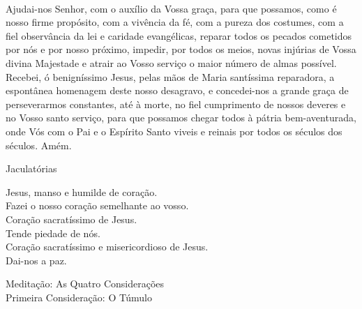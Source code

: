 \documentclass{book}
\begin{document}
\begin{flushleft}
    \vspace{.2cm} \\
    Ajudai-nos Senhor, com o auxílio da Vossa graça, para que possamos, como é nosso firme propósito, com a vivência da fé, com a pureza dos costumes, com a fiel observância da lei e caridade evangélicas, reparar todos os pecados cometidos por nós e por nosso próximo, impedir, por todos os meios, novas injúrias de Vossa divina Majestade e atrair ao Vosso serviço o maior número de almas possível.
    \vspace{.2cm} \\
    Recebei, ó benigníssimo Jesus, pelas mãos de Maria santíssima reparadora, a espontânea homenagem deste nosso desagravo, e concedei-nos a grande graça de perseverarmos constantes, até à morte, no fiel cumprimento de nossos deveres e no Vosso santo serviço, para que possamos chegar todos à pátria bem-aventurada, onde Vós com o Pai e o Espírito Santo viveis e reinais por todos os séculos dos séculos. Amém.
\end{flushleft}
\begin{center}
    Jaculatórias
\end{center}
\begin{flushleft}
    \VbarRed{} Jesus, manso e humilde de coração. \\
    \RbarRed{} Fazei o nosso coração semelhante ao vosso. \\
    \VbarRed{} Coração sacratíssimo de Jesus. \\
    \RbarRed{} Tende piedade de nós. \\
    \VbarRed{} Coração sacratíssimo e misericordioso de Jesus. \\
    \RbarRed{} Dai-nos a paz.
\end{flushleft}
\newpage
\begin{center}
    Meditação: As Quatro Considerações \\
    \hfill{} \break{}
    \textcolor{VioletRed2}{Primeira Consideração: O Túmulo}
\end{center}
\end{document}

